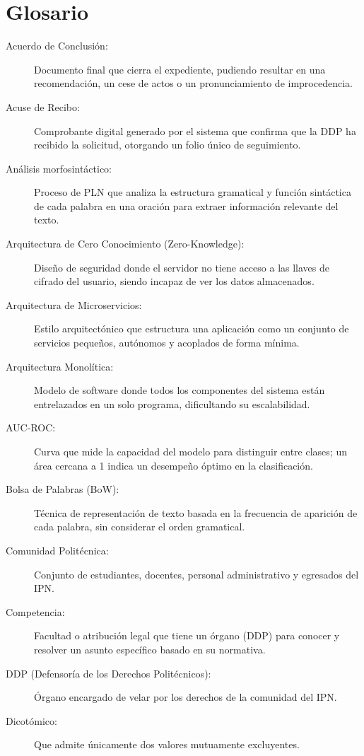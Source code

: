 \chapter{Glosario}

\begin{description}
    \item[Acuerdo de Conclusión:] Documento final que cierra el expediente, pudiendo resultar en una recomendación, un cese de actos o un pronunciamiento de improcedencia.
    \item[Acuse de Recibo:] Comprobante digital generado por el sistema que confirma que la DDP ha recibido la solicitud, otorgando un folio único de seguimiento.
     \item[Análisis morfosintáctico:] Proceso de PLN que analiza la estructura gramatical
    y función sintáctica de cada palabra en una oración para extraer información
    relevante del texto.
    \item[Arquitectura de Cero Conocimiento (Zero-Knowledge):] Diseño de seguridad donde el servidor no tiene acceso a las llaves de cifrado del usuario, siendo incapaz de ver los datos almacenados.
    \item[Arquitectura de Microservicios:] Estilo arquitectónico que estructura una aplicación como un conjunto de servicios pequeños, autónomos y acoplados de forma mínima.
    \item[Arquitectura Monolítica:] Modelo de software donde todos los componentes del sistema están entrelazados en un solo programa, dificultando su escalabilidad.
    \item[AUC-ROC:] Curva que mide la capacidad del modelo para distinguir entre clases; un área cercana a 1 indica un desempeño óptimo en la clasificación.
    \item[Bolsa de Palabras (BoW):] Técnica de representación de texto basada en la frecuencia de aparición de cada palabra, sin considerar el orden gramatical.
    \item[Comunidad Politécnica:] Conjunto de estudiantes, docentes, personal administrativo y egresados del IPN.
    \item[Competencia:] Facultad o atribución legal que tiene un órgano (DDP) para conocer y resolver un asunto específico basado en su normativa.
    \item[DDP (Defensoría de los Derechos Politécnicos):] Órgano encargado de velar por los derechos de la comunidad del IPN.
     \item[Dicotómico:] Que admite únicamente dos valores mutuamente excluyentes.

\end{description}
